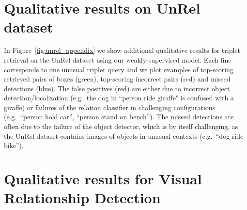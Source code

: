 \documentclass[10pt,twocolumn,letterpaper]{article}
\begin{document}
\section{Qualitative results on UnRel dataset}
\label{part:unrel}

In Figure~\ref{fig:unrel_appendix} we show additional qualitative results for triplet retrieval on the UnRel dataset using our weakly-supervised model. Each line corresponds to one unusual triplet query and we plot examples of top-scoring retrieved pairs of boxes (green), top-scoring incorrect pairs (red) and missed detections (blue). The false positives (red) are either due to incorrect object detection/localization (e.g.~the dog in ``person ride giraffe" is confused with a giraffe) or failures of the relation classifier in challenging configurations (e.g.~``person hold car'', ``person stand on bench'').
The missed detections are often due to the failure of the object detector, which is by itself challenging, as the UnRel dataset contains images of objects in unusual contexts (e.g.~``dog ride bike'').


\section{Qualitative results for Visual Relationship Detection}
\label{part:vrd}
\end{document}
